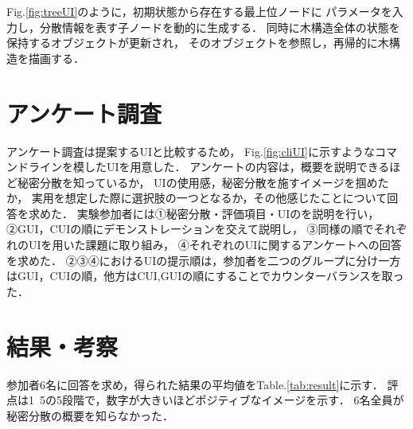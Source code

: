 \documentclass[twocolumn, fleqn, uplatex]{jsarticle}
\begin{document}
Fig.\ref{fig:treeUI}のように，初期状態から存在する最上位ノードに%
パラメータを入力し，分散情報を表す子ノードを動的に生成する．
同時に木構造全体の状態を保持するオブジェクトが更新され，%
そのオブジェクトを参照し，再帰的に木構造を描画する．

\section{アンケート調査}
アンケート調査は提案するUIと比較するため，%
Fig.\ref{fig:cliUI}に示すようなコマンドラインを模したUIを用意した．
アンケートの内容は，概要を説明できるほど秘密分散を知っているか，%
UIの使用感，秘密分散を施すイメージを掴めたか，%
実用を想定した際に選択肢の一つとなるか，その他感じたことについて回答を求めた．
実験参加者には①秘密分散・評価項目・UIのを説明を行い，%
②GUI，CUIの順にデモンストレーションを交えて説明し，%
③同様の順でそれぞれのUIを用いた課題に取り組み，%
④それぞれのUIに関するアンケートへの回答を求めた．%
②③④におけるUIの提示順は，参加者を二つのグループに分け一方はGUI，CUIの順，他方はCUI,GUIの順にすることでカウンターバランスを取った．

\section{結果・考察}
参加者6名に回答を求め，得られた結果の平均値をTable.\ref{tab:result}に示す．
評点は1~5の5段階で，数字が大きいほどポジティブなイメージを示す．%
6名全員が秘密分散の概要を知らなかった．

\begin{table}[htbp]
	\centering
	\caption{Average of survey results.}
	\label{tab:result}
\end{table}
\end{document}
